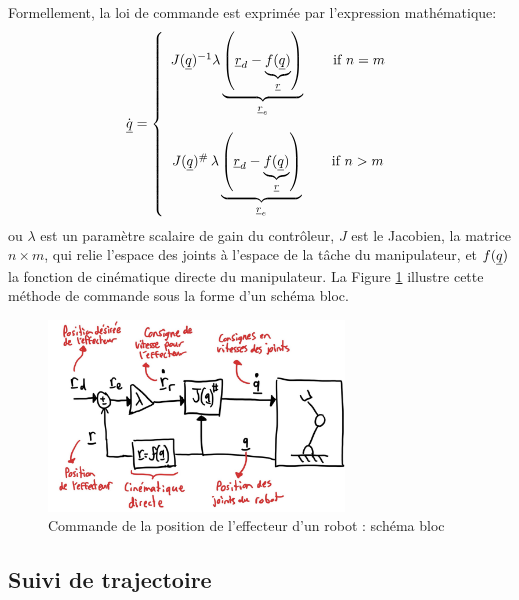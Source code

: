 Formellement, la loi de commande est exprimée par l'expression mathématique:
\begin{align}
\dot{\underline{q}} = \left\{ \begin{array}{c}
 J(\underline{q})^{-1} \lambda 
 \underbrace{ \left( \underline{r}_d  - \underbrace{f(\underline{q})}_{\underline{r}}  \right) }_{\underline{r}_e} 
 \quad\quad \text{if $n=m$}
 \\ \\
 J(\underline{q})^{\#} \, \lambda  \underbrace{ \left( \underline{r}_d  - \underbrace{f(\underline{q})}_{\underline{r}}  \right) }_{\underline{r}_e}    \quad\quad \text{if $n>m$}
\end{array}
\right.
\end{align}
ou $\lambda$ est un paramètre scalaire de gain du contrôleur, $J$ est le Jacobien, la matrice $n \times m$, qui relie l'espace des joints à l'espace de la tâche du manipulateur, et $f(\underline{q})$ la fonction de cinématique directe du manipulateur. La Figure \ref{fig:robotspeedcontrolpos} illustre cette méthode de commande sous la forme d'un schéma bloc. 
\begin{figure}[H]
	\centering
		\includegraphics[width=0.7\textwidth]{fig/robotspeedcontrolpos.jpg}
	\caption{Commande de la position de l'effecteur d'un robot : schéma bloc}
	\label{fig:robotspeedcontrolpos}
\end{figure}








\subsection{Suivi de trajectoire}
\label{sec:trajcontrol}

